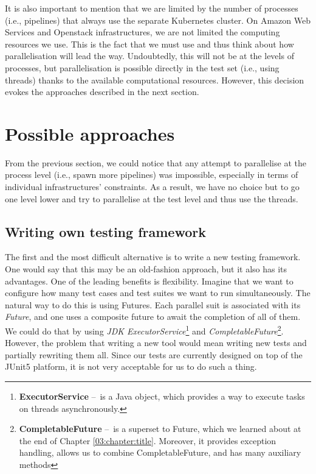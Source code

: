 It is also important to mention that we are limited by the number of processes (i.e., pipelines) that always use the separate Kubernetes cluster.
On Amazon Web Services and Openstack infrastructures, we are not limited the computing resources we use.
This is the fact that we must use and thus think about how parallelisation will lead the way.
Undoubtedly, this will not be at the levels of processes, but parallelisation is possible directly in the test set (i.e., using threads) thanks to the available computational resources.
However, this decision evokes the approaches described in the next section.

\section{Possible approaches}
\label{05:possibleapproaches}

From the previous section, we could notice that any attempt to parallelise at the process level (i.e., spawn more pipelines) was impossible, especially in terms of individual infrastructures' constraints.
As a result, we have no choice but to go one level lower and try to parallelise at the test level and thus use the threads.

\subsection{Writing own testing framework}

The first and the most difficult alternative is to write a new testing framework.
One would say that this may be an old-fashion approach, but it also has its advantages.
One of the leading benefits is flexibility.
Imagine that we want to configure how many test cases and test suites we want to run simultaneously.
The natural way to do this is using Futures.
Each parallel suit is associated with its \emph{Future}, and one uses a composite future to await the completion of all of them.
We could do that by using \emph{JDK ExecutorService}\footnote{\textbf{ExecutorService} \---\ is a Java object, which provides a way to execute tasks on threads asynchronously.} and \emph{CompletableFuture}\footnote{\textbf{CompletableFuture} \---\ is a superset to Future, which we learned about at the end of Chapter \ref{03:chapter:title}. Moreover, it provides exception handling, allows us to combine CompletableFuture, and has many auxiliary methods}.
However, the problem that writing a new tool would mean writing new tests and partially rewriting them all.
Since our tests are currently designed on top of the JUnit5 platform, it is not very acceptable for us to do such a thing.

